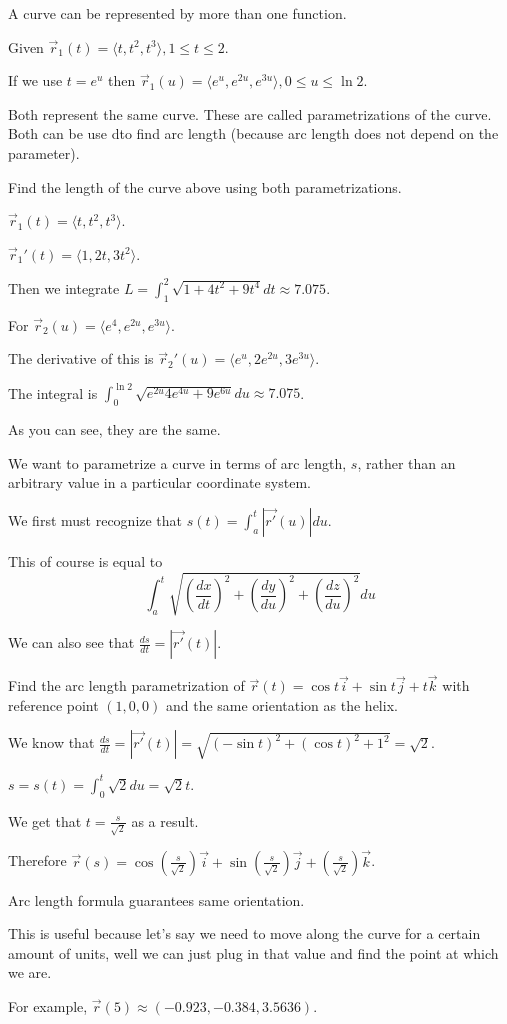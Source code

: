 \documentclass[../calc3.tex]{subfiles}
\begin{document}
A curve can be represented by more than one function.

\begin{example}
    Given $\vec{r}_1(t)=\langle t,t^2,t^3\rangle, 1\leq t\leq 2$.

    If we use $t=e^u$ then $\vec{r}_1(u)=\langle e^u, e^{2u}, e^{3u}\rangle, 0\leq u\leq \ln 2$.

    Both represent the same curve. These are called parametrizations of the curve. Both can be use dto find arc length (because arc length does not depend on the parameter).
\end{example}

\begin{example}
    Find the length of the curve above using both parametrizations.

    $\vec{r}_1(t)=\langle t,t^2,t^3\rangle$.

    $\vec{r}_1'(t)=\langle 1,2t,3t^2\rangle$.

    Then we integrate $L=\int_1^2 \sqrt{1+4t^2+9t^4}dt \approx 7.075$.

    For $\vec{r}_2(u)=\langle e^4,e^{2u},e^{3u}\rangle$.

    The derivative of this is $\vec{r}_2'(u)=\langle e^u, 2e^{2u}, 3e^{3u}\rangle$.

    The integral is $\int_0^{\ln 2}\sqrt{e^{2u}4e^{4u}+9e^{6u}}du \approx 7.075$.

    As you can see, they are the same.
\end{example}

We want to parametrize a curve in terms of arc length, $s$, rather than an arbitrary value in a particular coordinate system.

We first must recognize that $s(t)=\int_a^t |\vec{r'}(u)|du$.

This of course is equal to 
\[ \int_a^t \sqrt{\left(\frac{dx}{dt}\right)^2+\left( \frac{dy}{du}\right)^2 + \left(\frac{dz}{du}\right)^2}du \]

We can also see that $\frac{ds}{dt}=|\vec{r'}(t)|$.

\begin{example}
    Find the arc length parametrization of $\vec{r}(t)=\cos t\vec{i}+\sin t\vec{j}+t\vec{k}$ with reference point $(1,0,0)$ and the same orientation as the helix.

    We know that $\frac{ds}{dt}=|\vec{r'}(t)| = \sqrt{(-\sin t)^2+(\cos t)^2+1^2}=\sqrt{2}$.

    $s=s(t)=\int_0^t \sqrt{2}du = \sqrt{2}t$.

    We get that $t=\frac{s}{\sqrt{2}}$ as a result.

    Therefore $\vec{r}(s)=\cos \left(\frac{s}{\sqrt{2}}\right)\vec{i}+\sin\left(\frac{s}{\sqrt{2}}\right)\vec{j}+\left(\frac{s}{\sqrt{2}}\right)\vec{k}$.

    Arc length formula guarantees same orientation.

    This is useful because let's say we need to move along the curve for a certain amount of units, well we can just plug in that value and find the point at which we are.

    For example, $\vec{r}(5)\approx (-0.923, -0.384, 3.5636)$.
\end{example}
\end{document}
